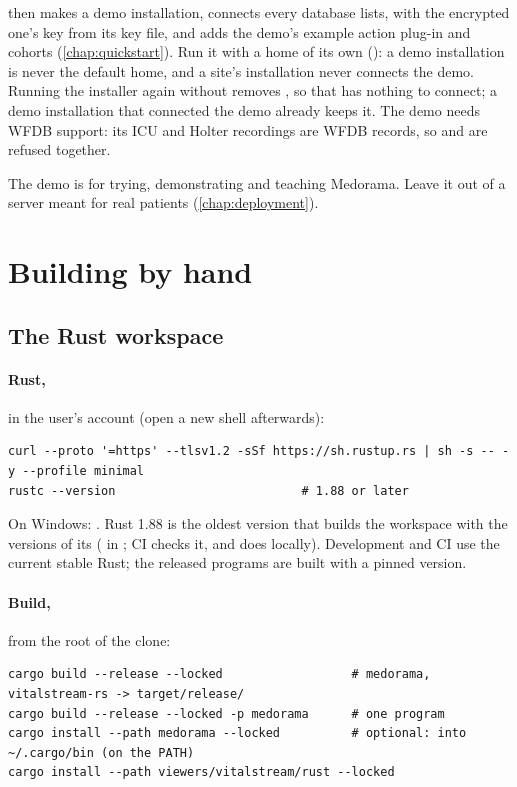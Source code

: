  then makes a demo installation, connects every database
 lists, with the encrypted one's key from its key file, and adds the
demo's example action plug-in and cohorts (\cref{chap:quickstart}). Run it with a home of its own
(): a demo installation is never the default home,
and a site's installation never connects the demo. Running the installer again without
 removes , so that  has nothing to connect; a
demo installation that connected the demo already keeps it. The demo needs WFDB support:
its ICU and Holter recordings are WFDB records, so  and  are refused
together.

\begin{note}
The demo is for trying, demonstrating and teaching Medorama. Leave it out of a server meant for
real patients (\cref{chap:deployment}).
\end{note}

\section{Building by hand}
\label{sec:installation-by-hand}

\subsection{The Rust workspace}
\label{sec:installation-rust}

\paragraph{Rust,} in the user's account (open a new shell afterwards):
\begin{lstlisting}[style=shell]
curl --proto '=https' --tlsv1.2 -sSf https://sh.rustup.rs | sh -s -- -y --profile minimal
rustc --version                          # 1.88 or later
\end{lstlisting}
On Windows: . Rust 1.88 is the oldest version that builds
the workspace with the versions of its  ( in
; CI checks it, and  does locally). Development and CI use the
current stable Rust; the released programs are built with a pinned version.

\paragraph{Build,} from the root of the clone:
\begin{lstlisting}[style=shell]
cargo build --release --locked                  # medorama, vitalstream-rs -> target/release/
cargo build --release --locked -p medorama      # one program
cargo install --path medorama --locked          # optional: into ~/.cargo/bin (on the PATH)
cargo install --path viewers/vitalstream/rust --locked
\end{lstlisting}

